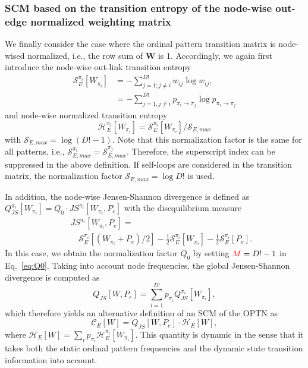 \documentclass[aip,cha,reprint,nofootinbib]{revtex4-1}
\begin{document}
\subsubsection{SCM based on the transition entropy of the node-wise out-edge normalized weighting matrix}

We finally consider the case where the ordinal pattern transition matrix is node-wised normalized, i.e., the row sum of $\mathbf{W}$ is 1. Accordingly, we again first introduce the node-wise out-link transition entropy
\begin{equation}
\begin{split}
\mathcal{S}_{E}^{\pi_i}[W_{\pi_i}] &= - \sum_{j = 1; j \neq i}^{D!} w_{ij} \log w_{ij},  \\ 
&= - \sum_{j=1, j \neq i}^{D!} p_{\pi_i \to \pi_j} \log p_{\pi_i \to \pi_j} 
\end{split}
\end{equation}
and node-wise normalized transition entropy
\begin{equation}
\mathcal{H}_{E}^{\pi_i}[W_{\pi_i}] = \mathcal{S}_{E}^{\pi_i}[W_{\pi_i}] / \mathcal{S}_{E, max} 
\end{equation}
with $\mathcal{S}_{E, max} = \log (D! - 1)$. Note that this normalization factor is the same for all patterns, i.e., $\mathcal{S}_{E, max}^{\pi_i} = \mathcal{S}_{E, max}^{\pi_j}$. Therefore, the superscript index can be suppressed in the above definition. {\color{red}If self-loops are considered in the transition matrix, the normalization factor $\mathcal{S}_{E, max} = \log D! $ is used.} 

In addition, the node-wise Jensen-Shannon divergence is defined as $Q_{JS}^{\pi_i}[W_{\pi_i}] = Q_0 \cdot JS^{\pi_i} [W_{\pi_i}, P_e]$ with the disequilibrium measure
\begin{eqnarray}
&&JS^{\pi_i} [W_{\pi_i}, P_e] = \nonumber \\
&&\quad \mathcal{S}_{E}^{\pi_i}[(W_{\pi_i} + P_e)/2] - \frac{1}{2}\mathcal{S}_{E}^{\pi_i}[W_{\pi_i}] - \frac{1}{2}\mathcal{S}_{E}^{\pi_i}[P_e]. 
\end{eqnarray}
In this case, we obtain the normalization factor $Q_0$ by setting ${\color{red}M} = D! - 1$ in Eq.~\eqref{eq:Q0}. Taking into account node frequencies, the global Jensen-Shannon divergence is computed as 
\begin{equation}
Q_{JS}[W, P_e] = \sum_{i=1}^{D!} p_{\pi_i} Q_{JS}^{\pi_i}[W_{\pi_i}], 
\end{equation}
which therefore yields an alternative definition of an SCM of the OPTN as 
\begin{equation}
\mathcal{C}_{E}[W] = Q_{JS}[W, P_e] \cdot \mathcal{H}_{E}[W], 
\end{equation}
where $\mathcal{H}_{E}[W] = \sum_{i} p_{\pi_i} \mathcal{H}_{E}^{\pi_i}[W_{\pi_i}]$. This quantity is dynamic in the sense that it takes both the static ordinal pattern frequencies and the dynamic state transition information into account. 
\end{document}
